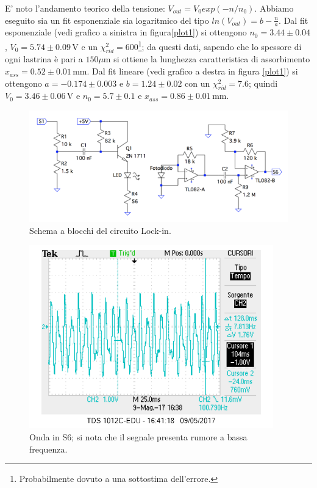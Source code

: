 \documentclass[10pt,a4paper]{article}
\begin{document}
E' noto l'andamento teorico della tensione: $V_{out}=V_0 exp(-n/n_0)$. Abbiamo eseguito sia un fit esponenziale  sia logaritmico del tipo $ln(V_{out})=b-\frac{n}{a}$. Dal fit esponenziale (vedi grafico a sinistra in figura\ref{plot1}) si ottengono $n_0=3.44\pm0.04$, $V_0=5.74\pm0.09\,\mbox{V}$ e un $\chi^2 _{rid}=600$\footnote{Probabilmente dovuto a una sottostima dell'errore.}; da questi dati, sapendo che lo spessore di ogni lastrina è pari a $150\mu \mbox{m}$ si ottiene la lunghezza caratteristica di assorbimento $x_{ass}=0.52\pm0.01\,\mbox{mm}$. Dal fit lineare (vedi grafico a destra in figura \ref{plot1}) si ottengono $a=-0.174\pm0.003$ e $b=1.24\pm0.02$ con un $\chi^2_{rid}=7.6$; quindi $V_0= 3.46\pm0.06\,\mbox{V}$ e $n_0=5.7\pm0.1$ e $x_{ass}=0.86\pm0.01\,\mbox{mm}$.


\begin{figure}[!htb]
  \centering
  \includegraphics[scale=0.75]{ampli-preampli.png}
\caption{Schema a blocchi del circuito Lock-in.\label{fig:ampli-preampli}}
\end{figure}

\begin{figure}[!htb]
  \centering
  \includegraphics[scale=0.75]{S6.png}
\caption{Onda in S6; si nota che il segnale presenta rumore a bassa frequenza.\label{osc:S6}}
\end{figure}
\end{document}
